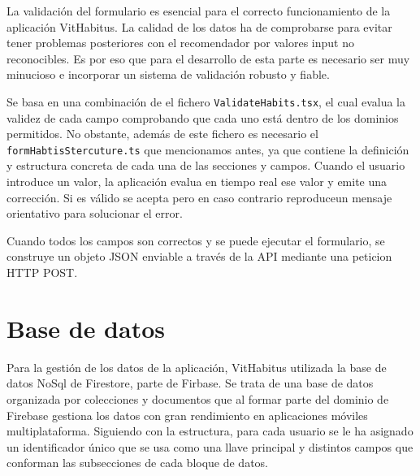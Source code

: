 La validación del formulario es esencial para el correcto funcionamiento de la aplicación VitHabitus. La calidad de los datos ha de comprobarse para evitar tener problemas posteriores con el recomendador por valores input no reconocibles. Es por eso que para el desarrollo de esta parte es necesario ser muy minucioso e incorporar un sistema de validación robusto y fiable.

Se basa en una combinación de el fichero \texttt{ValidateHabits.tsx}, el cual evalua la validez de cada campo comprobando que cada uno está dentro de los dominios permitidos. No obstante, además de este fichero es necesario el \texttt{formHabtisStercuture.ts} que mencionamos antes, ya que contiene la definición y estructura concreta de cada una de las secciones y campos. Cuando el usuario introduce un valor, la aplicación evalua en tiempo real ese valor y emite una corrección. Si es válido se acepta pero en caso contrario reproduceun mensaje orientativo para solucionar el error.

Cuando todos los campos son correctos y se puede ejecutar el formulario, se construye un objeto JSON enviable a través de la API mediante una peticion HTTP POST.

\section{Base de datos}

Para la gestión de los datos de la aplicación, VitHabitus utilizada la base de datos NoSql de Firestore, parte de Firbase. Se trata de una base de datos organizada por colecciones y documentos que al formar parte del dominio de Firebase gestiona los datos con gran rendimiento en aplicaciones móviles multiplataforma. Siguiendo con la estructura, para cada usuario se le ha asignado un identificador único que se usa como una llave principal y distintos campos que conforman las subsecciones de cada bloque de datos.

